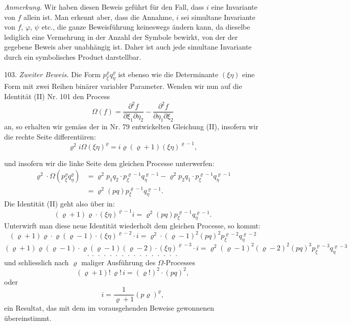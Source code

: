 \documentclass[11pt]{article}
\providecommand{\weberpage}[1]{}
\let\Omega\varOmega
\begin{document}
\textit{Anmerkung.} Wir haben diesen Beweis geführt für den Fall, dass $i$ eine Invariante von $f$ allein ist. Man erkennt aber, dass die Annahme, $i$ sei simultane Invariante von $f$, $\varphi$, $\psi$ etc., die ganze Beweisführung keineswegs ändern kann, da dieselbe lediglich eine Vermehrung in der Anzahl der Symbole bewirkt, von der der gegebene Beweis aber unabhängig ist. Daher ist auch jede simultane Invariante durch ein symbolisches Product darstellbar.

103. \textit{Zweiter Beweis.} Die Form $p_\xi^\varrho q_\eta^\varrho$ ist ebenso wie die Determinante $(\xi\eta)$ eine Form mit zwei Reihen binärer variabler Parameter. Wenden wir nun auf die Identität (II) Nr. 101 den Process
\[
\Omega(f) = \frac{\partial^2 f}{\partial \xi_1 \partial \eta_2} - \frac{\partial^2 f}{\partial \eta_1 \partial \xi_2}
\]
an, so erhalten wir gemäss der in Nr. 79 entwickelten Gleichung (II), insofern wir die rechte Seite differentiiren:
\[
\varrho^2 i \Omega(\xi\eta)^\varrho = i \varrho (\varrho + 1) (\xi\eta)^{\varrho - 1},
\]


\weberpage{114}
und insofern wir die linke Seite dem gleichen Processe unterwerfen:
\[
\begin{aligned}
\varrho^2 \cdot \Omega(p_\xi^\varrho q_\eta^\varrho) &= \varrho^2 p_1 q_2 \cdot p_\xi^{\varrho-1} q_\eta^{\varrho-1} - \varrho^2 p_2 q_1 \cdot p_\xi^{\varrho-1} q_\eta^{\varrho-1}\\
&= \varrho^2 (pq) p_\xi^{\varrho-1} q_\eta^{\varrho-1}.
\end{aligned}
\]
Die Identität (II) geht also über in:
\[
(\varrho + 1) \varrho \cdot (\xi\eta)^{\varrho-1} i = \varrho^2 (pq) p_\xi^{\varrho-1} q_\eta^{\varrho-1}.
\]
Unterwirft man diese neue Identität wiederholt dem gleichen Processe, so kommt:
\[
(\varrho + 1) \varrho \cdot \varrho (\varrho - 1) \cdot (\xi\eta)^{\varrho-2} \cdot i = \varrho^2 \cdot (\varrho - 1)^2 (pq)^2 p_\xi^{\varrho-2} q_\eta^{\varrho-2}
\]
\[
(\varrho + 1) \varrho (\varrho - 1) \cdot \varrho (\varrho - 1) (\varrho - 2) \cdot (\xi\eta)^{\varrho-3} \cdot i = \varrho^2 (\varrho - 1)^2 (\varrho - 2)^2 (pq)^3 p_\xi^{\varrho-3} q_\eta^{\varrho-3}
\]
\[
\cdot\ \cdot\ \cdot\ \cdot\ \cdot\ \cdot\ \cdot\ \cdot\ \cdot\ \cdot\ \cdot\ \cdot\ \cdot\ \cdot\ \cdot\ \cdot
\]
und schliesslich nach $\varrho$ maliger Ausführung des $\Omega$-Processes
\[
(\varrho + 1)!\, \varrho!\, i = (\varrho!)^2 \cdot (pq)^2,
\]
oder
\[
i = \frac{1}{\varrho + 1} (p\varrho)^\varrho, %
\]
ein Resultat, das mit dem im vorausgehenden Beweise gewonnenen übereinstimmt.
\end{document}

